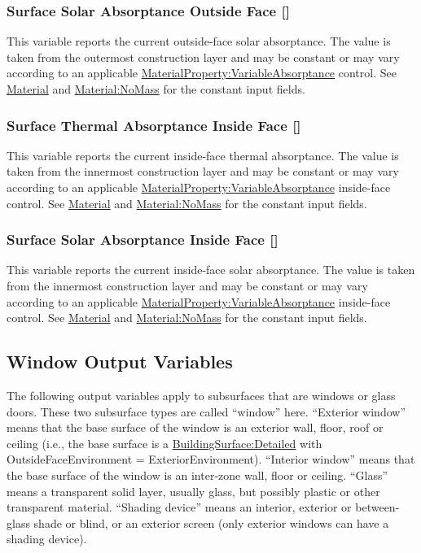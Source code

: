 \subsubsection{Surface Solar Absorptance Outside Face {[}{]}}\label{surface-solar-absorptance-outside-face}

This variable reports the current outside-face solar absorptance. The value is taken from the outermost construction layer and may be constant or may vary according to an applicable \hyperref[materialpropertyvariableabsorptance]{MaterialProperty:VariableAbsorptance} control. See \hyperref[material]{Material} and \hyperref[materialnomass]{Material:NoMass} for the constant input fields.

\subsubsection{Surface Thermal Absorptance Inside Face {[}{]}}\label{surface-thermal-absorptance-inside-face}

This variable reports the current inside-face thermal absorptance. The value is taken from the innermost construction layer and may be constant or may vary according to an applicable \hyperref[materialpropertyvariableabsorptance]{MaterialProperty:VariableAbsorptance} inside-face control. See \hyperref[material]{Material} and \hyperref[materialnomass]{Material:NoMass} for the constant input fields.

\subsubsection{Surface Solar Absorptance Inside Face {[}{]}}\label{surface-solar-absorptance-inside-face}

This variable reports the current inside-face solar absorptance. The value is taken from the innermost construction layer and may be constant or may vary according to an applicable \hyperref[materialpropertyvariableabsorptance]{MaterialProperty:VariableAbsorptance} inside-face control. See \hyperref[material]{Material} and \hyperref[materialnomass]{Material:NoMass} for the constant input fields.

\subsection{Window Output Variables}\label{window-output-variables-1}

The following output variables apply to subsurfaces that are windows or glass doors. These two subsurface types are called ``window'' here. ``Exterior window'' means that the base surface of the window is an exterior wall, floor, roof or ceiling (i.e., the base surface is a \hyperref[buildingsurfacedetailed]{BuildingSurface:Detailed} with OutsideFaceEnvironment = ExteriorEnvironment). ``Interior window'' means that the base surface of the window is an inter-zone wall, floor or ceiling. ``Glass'' means a transparent solid layer, usually glass, but possibly plastic or other transparent material. ``Shading device'' means an interior, exterior or between-glass shade or blind, or an exterior screen (only exterior windows can have a shading device).

